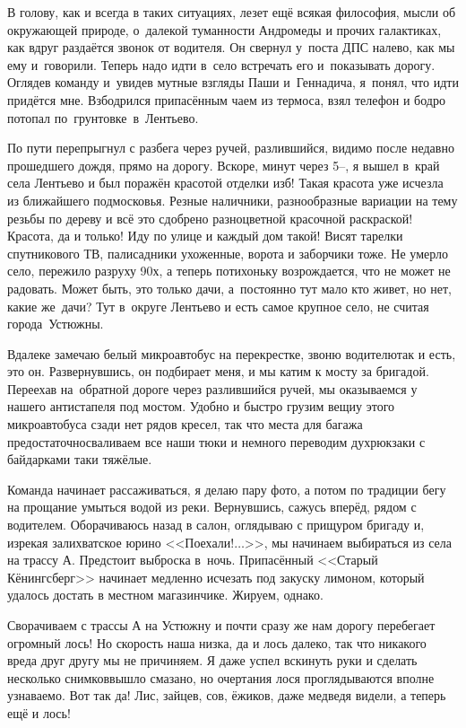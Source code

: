 В голову, как и всегда в таких ситуациях, лезет ещё всякая философия, мысли об окружающей природе, о~далекой туманности Андромеды и прочих галактиках, как вдруг раздаётся звонок от водителя. Он свернул у~поста ДПС налево, как мы ему и~говорили. Теперь надо идти в~село встречать его и~показывать дорогу. Оглядев команду и~увидев мутные взгляды Паши и~Геннадича, я~понял, что идти придётся мне. Взбодрился припасённым чаем из термоса, взял телефон и бодро потопал по~грунтовке~в~Лентьево. 
 
По пути перепрыгнул с разбега через ручей, разлившийся, видимо после недавно прошедшего дождя, прямо на дорогу. Вскоре, минут через 5\thinspace\nobreakdash--, я вышел в~край села Лентьево и был поражён красотой отделки изб! Такая красота уже исчезла из ближайшего подмосковья. Резные наличники, разнообразные вариации на тему резьбы по дереву и всё это сдобрено разноцветной красочной раскраской! Красота, да и только! Иду по улице и каждый дом такой! Висят тарелки спутникового ТВ, палисадники ухоженные, ворота и заборчики тоже. Не умерло село, пережило разруху 90\sdash х, а теперь потихоньку возрождается, что не может не радовать. Может быть, это только дачи, а~постоянно тут мало кто живет, но нет, какие же~дачи? Тут в~округе Лентьево и есть самое крупное село, не считая города~Устюжны.

Вдалеке замечаю белый микроавтобус на перекрестке, звоню водителю\mdash так и есть, это он. Развернувшись, он подбирает меня, и мы катим к мосту за бригадой. Переехав на~обратной дороге через разлившийся ручей, мы оказываемся у нашего антистапеля под мостом. Удобно и быстро грузим вещи\mdash у этого микроавтобуса сзади нет рядов кресел, так что места для багажа предостаточно\mdash сваливаем все наши тюки и немного переводим дух\mdash рюкзаки с байдарками таки тяжёлые. 

Команда начинает рассаживаться, я делаю пару фото, а потом по традиции бегу на прощание умыться водой из реки. Вернувшись, сажусь вперёд, рядом с водителем. Оборачиваюсь назад в салон, оглядываю с прищуром бригаду и, изрекая залихватское юрино <<Поехали!$\ldots$>>, мы начинаем выбираться из села на трассу А. Предстоит выброска в~ночь. Припасённый <<Старый Кёнингсберг>> начинает медленно исчезать под закуску лимоном, который удалось достать в местном магазинчике. Жируем, однако.

Сворачиваем с трассы А на Устюжну и почти сразу же нам дорогу перебегает огромный лось! Но скорость наша низка, да и лось далеко, так что никакого вреда друг другу мы не причиняем. Я даже успел вскинуть руки и сделать несколько снимков\mdash вышло смазано, но очертания лося проглядываются вполне узнаваемо. Вот так да! Лис, зайцев, сов, ёжиков, даже медведя видели, а теперь ещё и лось! 

